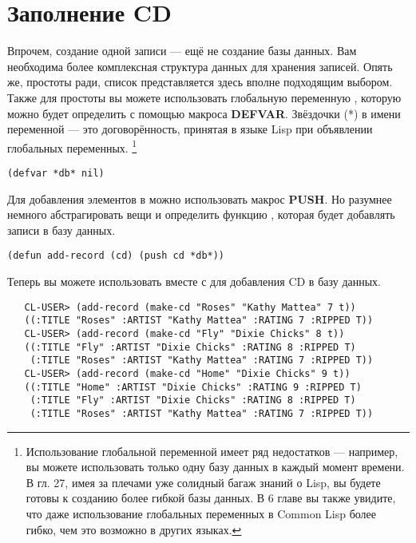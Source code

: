 \section{Заполнение CD}

Впрочем, создание одной записи --- ещё не создание базы данных. Вам необходима более
комплексная структура данных для хранения записей. Опять же, простоты ради, список
представляется здесь вполне подходящим выбором. Также для простоты вы можете использовать
глобальную переменную , которую можно будет определить с помощью макроса
\textbf{DEFVAR}. Звёздочки (*) в имени переменной --- это договорённость, принятая в языке
Lisp при объявлении глобальных переменных. \footnote{Использование глобальной переменной
  имеет ряд недостатков --- например, вы можете использовать только одну базу данных в
  каждый момент времени. В гл. 27, имея за плечами уже солидный багаж знаний о Lisp, вы
  будете готовы к созданию более гибкой базы данных. В 6 главе вы также увидите, что даже
  использование глобальных переменных в Common Lisp более гибко, чем это возможно в других
  языках.}

\begin{lstlisting}
(defvar *db* nil)
\end{lstlisting}

Для добавления элементов в  можно использовать макрос \textbf{PUSH}. Но
разумнее немного абстрагировать вещи и определить функцию , которая будет
добавлять записи в базу данных.

\begin{lstlisting}
(defun add-record (cd) (push cd *db*))
\end{lstlisting}

Теперь вы можете использовать  вместе с  для добавления CD
в базу данных.

\begin{verbatim}
   CL-USER> (add-record (make-cd "Roses" "Kathy Mattea" 7 t))
   ((:TITLE "Roses" :ARTIST "Kathy Mattea" :RATING 7 :RIPPED T))
   CL-USER> (add-record (make-cd "Fly" "Dixie Chicks" 8 t))
   ((:TITLE "Fly" :ARTIST "Dixie Chicks" :RATING 8 :RIPPED T)
    (:TITLE "Roses" :ARTIST "Kathy Mattea" :RATING 7 :RIPPED T))
   CL-USER> (add-record (make-cd "Home" "Dixie Chicks" 9 t))
   ((:TITLE "Home" :ARTIST "Dixie Chicks" :RATING 9 :RIPPED T)
    (:TITLE "Fly" :ARTIST "Dixie Chicks" :RATING 8 :RIPPED T)
    (:TITLE "Roses" :ARTIST "Kathy Mattea" :RATING 7 :RIPPED T))
\end{verbatim}

